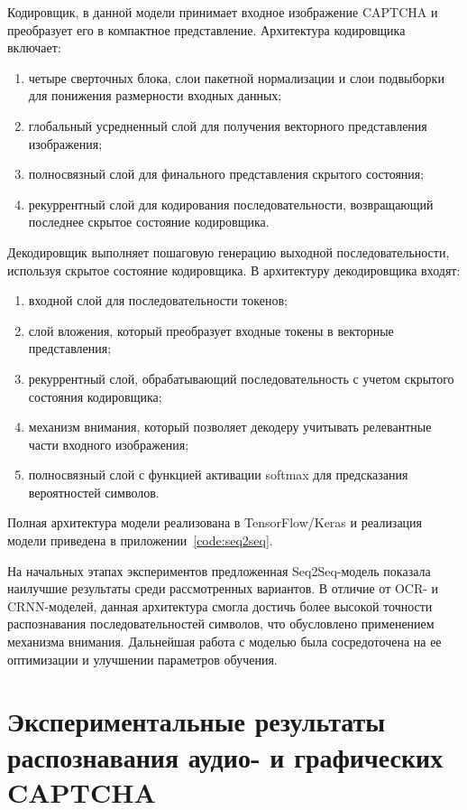 Кодировщик, в данной модели принимает входное изображение CAPTCHA и преобразует 
его в компактное представление. Архитектура кодировщика включает:

\begin{enumerate}
    \item четыре сверточных блока, слои пакетной нормализации и слои подвыборки 
    для понижения размерности входных данных;
    \item глобальный усредненный слой для получения векторного представления 
    изображения;
    \item полносвязный слой для финального представления скрытого состояния;
    \item рекуррентный слой для кодирования последовательности, возвращающий 
    последнее скрытое состояние кодировщика.
\end{enumerate}

Декодировщик выполняет пошаговую генерацию выходной последовательности, используя 
скрытое состояние кодировщика. В архитектуру декодировщика входят:

\begin{enumerate}
    \item входной слой для последовательности токенов;
    \item слой вложения, который преобразует входные токены в векторные 
    представления;
    \item рекуррентный слой, обрабатывающий последовательность с учетом скрытого 
    состояния кодировщика;
    \item механизм внимания, который позволяет декодеру учитывать релевантные 
    части входного изображения;
    \item полносвязный слой с функцией активации softmax для предсказания 
    вероятностей символов.
\end{enumerate}

Полная архитектура модели реализована в TensorFlow/Keras и реализация модели 
приведена в приложении~\ref{code:seq2seq}.

На начальных этапах экспериментов предложенная Seq2Seq-модель показала наилучшие 
результаты среди рассмотренных вариантов. В отличие от OCR- и CRNN-моделей, 
данная архитектура смогла достичь более высокой точности распознавания 
последовательностей символов, что обусловлено применением механизма внимания. 
Дальнейшая работа с моделью была сосредоточена на ее оптимизации и улучшении 
параметров обучения.

\section{Экспериментальные результаты распознавания аудио- и графических CAPTCHA}

